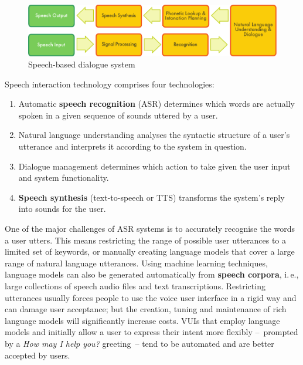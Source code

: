 \begin{multicols}{2}
\begin{figure}[htb]
  \center
  \includegraphics[width=\textwidth]{../_media/english/simple_speech-based_dialogue_architecture}
  \caption{Speech-based dialogue system}
\label{fig:dialoguearch_en}
\end{figure}

Speech interaction technology comprises four technologies: 

\begin{enumerate}
\item Automatic \textbf{speech recognition} (ASR) determines which words are actually spoken in a given sequence of sounds uttered by a user.  
\item Natural language understanding analyses the syntactic structure of a user’s utterance and interprets it according to the system in question.
\item Dialogue management determines which action to take given the user input and system functionality.   
\item \textbf{Speech synthesis} (text-to-speech or TTS) trans\-forms the system’s reply into sounds for the user.
\end{enumerate}

One of the major challenges of ASR systems is to accurately recognise the words a user utters. This means restricting the range of possible user utterances to a limited set of keywords, or manually creating language models that cover a large range of natural language utterances. Using machine learning techniques, language models can also be generated automatically from \textbf{speech corpora}, i.\,e., large collections of speech audio files and text transcriptions. Restricting utterances usually forces people to use the voice user interface in a rigid way and can damage user acceptance; but the creation, tuning and maintenance of rich language models will significantly increase costs. VUIs that employ language models and initially allow a user to express their intent more flexibly --~prompted by a \textit{How may I help you?} greeting~-- tend to be automated and are better accepted by users.


\end{multicols}
